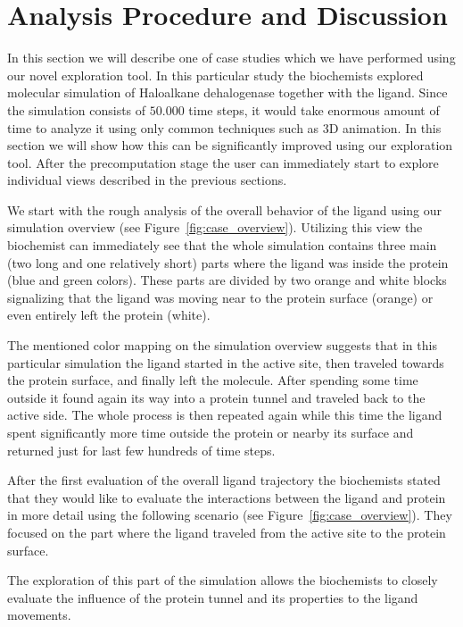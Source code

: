 \documentclass[twocolumn]{bmcart}%
\begin{document}
\section*{Analysis Procedure and Discussion}

In this section we will describe one of case studies which we have performed using our novel exploration tool.
In this particular study the biochemists explored molecular simulation of Haloalkane dehalogenase together with the ligand. 
Since the simulation consists of $50.000$ time steps, it would take enormous amount of time to analyze it using only common techniques such as 3D animation.
In this section we will show how this can be significantly improved using our exploration tool.
After the precomputation stage the user can immediately start to explore individual views described in the previous sections.

We start with the rough analysis of the overall behavior of the ligand using our simulation overview (see Figure~\ref{fig:case_overview}).
Utilizing this view the biochemist can immediately see that the whole simulation contains three main (two long and one relatively short) parts where the ligand was inside the protein (blue and green colors).
These parts are divided by two orange and white blocks signalizing that the ligand was moving near to the protein surface (orange) or even entirely left the protein (white).
 
The mentioned color mapping on the simulation overview suggests that in this particular simulation the ligand started in the active site, then traveled towards the protein surface, and finally left the molecule.
After spending some time outside it found again its way into a protein tunnel and traveled back to the active side.
The whole process is then repeated again while this time the ligand spent significantly more time outside the protein or nearby its surface and returned just for last few hundreds of time steps. 

After the first evaluation of the overall ligand trajectory the biochemists stated that they would like to evaluate the interactions between the ligand and protein in more detail using the following scenario (see Figure~\ref{fig:case_overview}). 
They focused on the part where the ligand traveled from the active site to the protein surface. 

The exploration of this part of the simulation allows the biochemists to closely evaluate the influence of the protein tunnel and its properties to the ligand movements.
\end{document}
